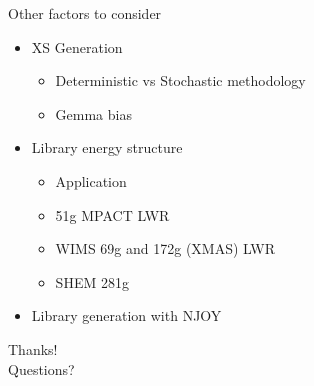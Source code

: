 \documentclass[sans,mathserif,aspectratio=169, 10pt]{beamer}
\begin{document}
\begin{frame}{Other factors to consider}
\begin{itemize}
\item XS Generation
	\begin{itemize}[<+->]
	\item Deterministic vs Stochastic methodology
	\item Gemma bias
	\end{itemize}
\item Library energy structure
	\begin{itemize}[<+->]
	\item Application
	\item 51g MPACT LWR
	\item WIMS 69g and 172g (XMAS) LWR
	\item SHEM 281g
	\end{itemize}

\item Library generation with NJOY
\end{itemize}
\end{frame}

\begin{frame}
\centering
\Huge
Thanks! \\
Questions?
\end{frame}
\end{document}
